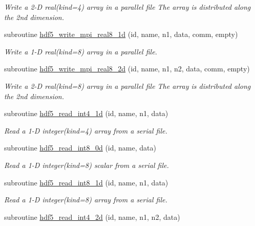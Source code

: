 \begin{DoxyCompactItemize}
\begin{DoxyCompactList}\small\item\em Write a 2-\/D real(kind=4) array in a parallel file The array is distributed along the 2nd dimension. \end{DoxyCompactList}\item 
subroutine \hyperlink{namespacemodhdf5_a6fe25705d9c64cf43c06c885a71878e2}{hdf5\+\_\+write\+\_\+mpi\+\_\+real8\+\_\+1d} (id, name, n1, data, comm, empty)
\begin{DoxyCompactList}\small\item\em Write a 1-\/D real(kind=8) array in a parallel file. \end{DoxyCompactList}\item 
subroutine \hyperlink{namespacemodhdf5_a670313739a46ec4d9006d8761d35157a}{hdf5\+\_\+write\+\_\+mpi\+\_\+real8\+\_\+2d} (id, name, n1, n2, data, comm, empty)
\begin{DoxyCompactList}\small\item\em Write a 2-\/D real(kind=8) array in a parallel file The array is distributed along the 2nd dimension. \end{DoxyCompactList}\item 
subroutine \hyperlink{namespacemodhdf5_afda2e44922def0d140ce850c12ef2f48}{hdf5\+\_\+read\+\_\+int4\+\_\+1d} (id, name, n1, data)
\begin{DoxyCompactList}\small\item\em Read a 1-\/D integer(kind=4) array from a serial file. \end{DoxyCompactList}\item 
subroutine \hyperlink{namespacemodhdf5_ac60e719f8d357b8ffab4f183a7ca4603}{hdf5\+\_\+read\+\_\+int8\+\_\+0d} (id, name, data)
\begin{DoxyCompactList}\small\item\em Read a 1-\/D integer(kind=8) scalar from a serial file. \end{DoxyCompactList}\item 
subroutine \hyperlink{namespacemodhdf5_a640df6ccea7f28d6ed6b578d8018d7d7}{hdf5\+\_\+read\+\_\+int8\+\_\+1d} (id, name, n1, data)
\begin{DoxyCompactList}\small\item\em Read a 1-\/D integer(kind=8) array from a serial file. \end{DoxyCompactList}\item 
subroutine \hyperlink{namespacemodhdf5_a29f383042b1dc2b1fc1155af48fc98a3}{hdf5\+\_\+read\+\_\+int4\+\_\+2d} (id, name, n1, n2, data)

\end{DoxyCompactItemize}
